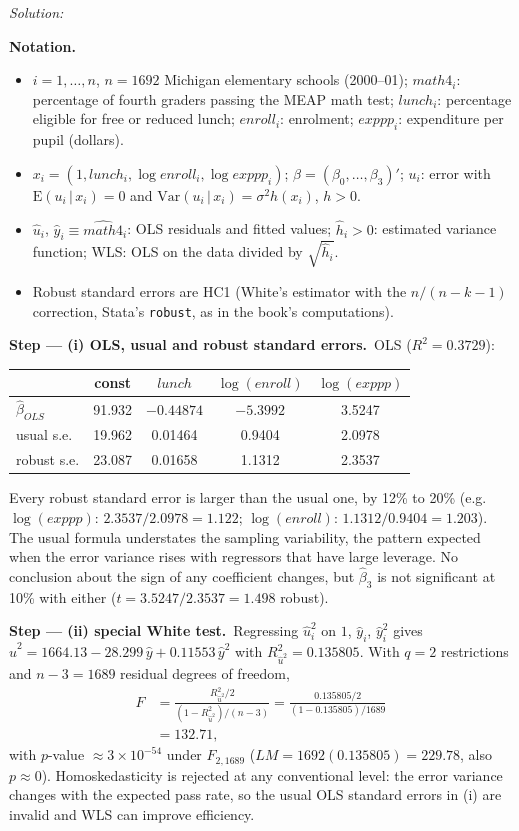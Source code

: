 \documentclass[11pt,a4paper]{article}
\newif\ifsolucoes
\newcommand{\espacoresol}{2.5cm}   %
\numberwithin{equation}{questao}
\newenvironment{notacao}{\par\smallskip\noindent\textbf{Notation.}\begin{itemize}[leftmargin=1.4em,topsep=1pt,itemsep=0pt]\small}{\end{itemize}}
\newcommand{\resolespaco}{\ifsolucoes\else\par\textit{Solution:}\vspace{\espacoresol}\par\fi}
\newcommand{\passo}[2]{\par\smallskip\noindent\textbf{Step --- #1.}~#2}
\newcommand{\var}[1]{\mathit{#1}}
\newcommand{\E}{\mathrm{E}}
\begin{document}
\resolespaco
\begin{sol}
\begin{notacao}
\item $i=1,\dots,n$, $n=1692$ Michigan elementary schools (2000--01); $\var{math4}_i$: percentage of fourth graders passing the MEAP math test; $\var{lunch}_i$: percentage eligible for free or reduced lunch; $\var{enroll}_i$: enrolment; $\var{exppp}_i$: expenditure per pupil (dollars).
\item $x_i=(1,\var{lunch}_i,\log\var{enroll}_i,\log\var{exppp}_i)$; $\beta=(\beta_0,\dots,\beta_3)'$; $u_i$: error with $\E(u_i\,|\,x_i)=0$ and $\mathrm{Var}(u_i\,|\,x_i)=\sigma^2h(x_i)$, $h>0$.
\item $\hat u_i$, $\hat y_i\equiv\widehat{\var{math4}}_i$: OLS residuals and fitted values; $\hat h_i>0$: estimated variance function; WLS: OLS on the data divided by $\sqrt{\hat h_i}$.
\item Robust standard errors are HC1 (White's estimator with the $n/(n-k-1)$ correction, Stata's \texttt{robust}, as in the book's computations).
\end{notacao}

\passo{(i) OLS, usual and robust standard errors}{OLS ($R^2=0.3729$):
\begin{center}\small
\begin{tabular}{lcccc}
\toprule
 & const & $\var{lunch}$ & $\log(\var{enroll})$ & $\log(\var{exppp})$\\
\midrule
$\hat\beta_{OLS}$ & 91.932 & $-0.44874$ & $-5.3992$ & 3.5247\\
usual s.e. & 19.962 & 0.01464 & 0.9404 & 2.0978\\
robust s.e. & 23.087 & 0.01658 & 1.1312 & 2.3537\\
\bottomrule
\end{tabular}
\end{center}
Every robust standard error is larger than the usual one, by 12\% to 20\% (e.g.\ $\log(\var{exppp})$: $2.3537/2.0978=1.122$;
$\log(\var{enroll})$: $1.1312/0.9404=1.203$). The usual formula understates the sampling variability, the pattern
expected when the error variance rises with regressors that have large leverage. No conclusion about the sign of
any coefficient changes, but $\hat\beta_3$ is not significant at 10\% with either ($t=3.5247/2.3537=1.498$ robust).}

\passo{(ii) special White test}{Regressing $\hat u_i^2$ on $1$, $\hat y_i$, $\hat y_i^2$ gives
$\hat u^2=1664.13-28.299\,\hat y+0.11553\,\hat y^2$ with $R^2_{\hat u^2}=0.135805$. With $q=2$ restrictions and
$n-3=1689$ residual degrees of freedom,
\begin{align}
F&=\frac{R^2_{\hat u^2}/2}{(1-R^2_{\hat u^2})/(n-3)}=\frac{0.135805/2}{(1-0.135805)/1689}\nonumber\\
&=132.71, \label{q18:F}
\end{align}
with $p$-value $\approx3\times10^{-54}$ under $F_{2,1689}$ ($LM=1692(0.135805)=229.78$, also $p\approx0$).
Homoskedasticity is rejected at any conventional level: the error variance changes with the expected pass rate,
so the usual OLS standard errors in (i) are invalid and WLS can improve efficiency.}


\end{sol}
\end{document}

